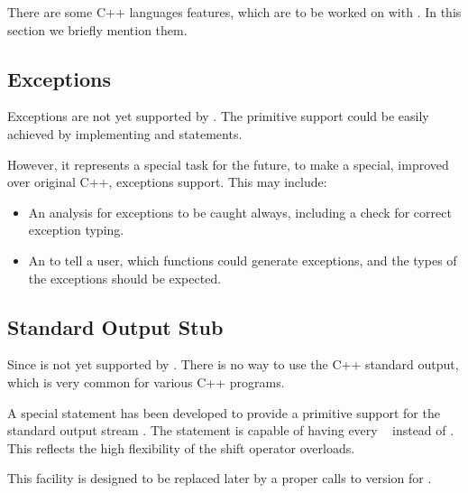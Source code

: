
There are some C++ languages features, which are to be worked on with \pcpp.
In this section we briefly mention them.

\subsection{Exceptions}

Exceptions are not yet supported by \pcpp. The primitive support could be 
easily achieved by implementing  and  statements.

However, it represents a special task for the future, to make a special, improved over 
original C++, exceptions support. This may include:

\begin{itemize}
 \item An analysis for exceptions to be caught always, including a check for 
 correct exception typing.
 \item An  to tell a user, which functions could generate
 exceptions, and the types of the exceptions should be expected.
\end{itemize}



\subsection{Standard Output Stub}

Since  is not yet supported by \pcpp. There is no way to 
use the C++ standard output, which is very common for various C++ programs.

A special statement has been developed to provide a primitive support for the standard output stream
. The  statement is capable of having every 
\jbmps\  instead of . This reflects the high flexibility
of the  shift operator overloads.

This facility is designed to be replaced later by a proper calls to 
version for \pcpp.
